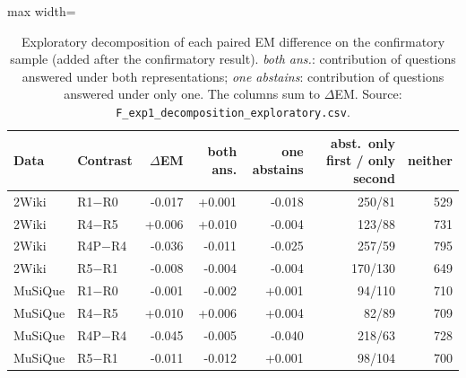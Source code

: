 \begin{table}[t]
\centering
\footnotesize
\begin{adjustbox}{max width=\linewidth}
\begin{tabular}{@{}llrrrrr@{}}
\toprule
Data & Contrast & $\Delta$EM & both ans. & one abstains & abst.\ only first / only second & neither \\
\midrule
2Wiki & R1$-$R0 & -0.017 & +0.001 & -0.018 & 250/81 & 529 \\
2Wiki & R4$-$R5 & +0.006 & +0.010 & -0.004 & 123/88 & 731 \\
2Wiki & R4P$-$R4 & -0.036 & -0.011 & -0.025 & 257/59 & 795 \\
2Wiki & R5$-$R1 & -0.008 & -0.004 & -0.004 & 170/130 & 649 \\
MuSiQue & R1$-$R0 & -0.001 & -0.002 & +0.001 & 94/110 & 710 \\
MuSiQue & R4$-$R5 & +0.010 & +0.006 & +0.004 & 82/89 & 709 \\
MuSiQue & R4P$-$R4 & -0.045 & -0.005 & -0.040 & 218/63 & 728 \\
MuSiQue & R5$-$R1 & -0.011 & -0.012 & +0.001 & 98/104 & 700 \\
\bottomrule
\end{tabular}
\end{adjustbox}
\caption{Exploratory decomposition of each paired EM difference on the confirmatory sample (added after the confirmatory result). \emph{both ans.}: contribution of questions answered under both representations; \emph{one abstains}: contribution of questions answered under only one. The columns sum to $\Delta$EM. Source: \texttt{F\_exp1\_decomposition\_exploratory.csv}.}
\label{tab:decomposition}
\end{table}
